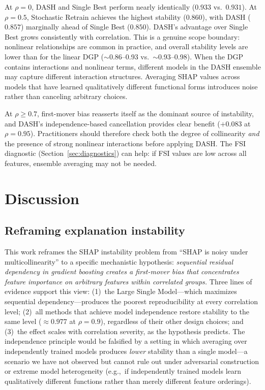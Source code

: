 \documentclass[11pt]{article}
\newcommand{\dash}{\textsc{DASH}}
\newcommand{\rhovar}{\rho}
\newcommand{\eg}{e.g.,\ }
\begin{document}
At $\rhovar = 0$, \dash{} and Single Best perform nearly identically
($0.933$ vs.\ $0.931$). At $\rhovar = 0.5$, Stochastic Retrain achieves
the highest stability ($0.860$), with \dash{} ($0.857$) marginally ahead
of Single Best ($0.850$). \dash{}'s advantage over Single Best grows
consistently with correlation. This is a genuine scope boundary: nonlinear relationships
are common in practice, and overall stability levels are lower than for
the linear DGP ($\sim$0.86--0.93 vs.\ $\sim$0.93--0.98). When the DGP
contains interactions and nonlinear terms, different models in the DASH
ensemble may capture different interaction structures. Averaging SHAP
values across models that have learned qualitatively different functional
forms introduces noise rather than canceling arbitrary choices.

At $\rhovar \geq 0.7$, first-mover bias reasserts itself as the dominant
source of instability, and \dash{}'s independence-based cancellation
provides clear benefit ($+0.083$ at $\rhovar = 0.95$).
Practitioners should therefore check both the degree of collinearity
\emph{and} the presence of strong nonlinear interactions before applying
\dash{}. The FSI diagnostic (Section~\ref{sec:diagnostics}) can help:
if FSI values are low across all features, ensemble averaging may not be
needed.


\section{Discussion}
\label{sec:discussion}

\subsection{Reframing explanation instability}

This work reframes the SHAP instability problem from ``SHAP is noisy
under multicollinearity'' to a specific mechanistic hypothesis:
\emph{sequential residual dependency in gradient boosting creates a
first-mover bias that concentrates feature importance on arbitrary
features within correlated groups.} Three lines of evidence support this view:
(1)~the Large Single Model---which maximizes sequential dependency---produces
the poorest reproducibility at every correlation level;
(2)~all methods that achieve model independence restore stability to the
same level ($\approx 0.977$ at $\rhovar = 0.9$), regardless of their other
design choices; and
(3)~the effect scales with correlation severity, as the hypothesis
predicts.
The independence principle would be falsified by a setting in which
averaging over independently trained models produces \emph{lower}
stability than a single model---a scenario we have not observed but
cannot rule out under adversarial construction or extreme model
heterogeneity (\eg if independently trained models learn qualitatively
different functions rather than merely different feature orderings).
\end{document}
